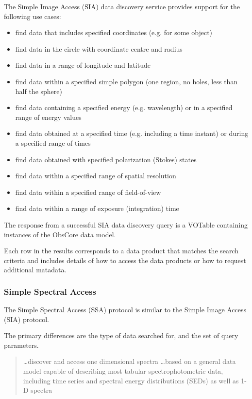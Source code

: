 \documentclass{article}
\begin{document}
The Simple Image Access (SIA) data discovery service provides support for
the following use cases:

\begin{itemize}
  \item find data that includes specified coordinates (e.g. for some object) 
  \item find data in the circle with coordinate centre and radius 
  \item find data in a range of longitude and latitude 
  \item find data within a specified simple  polygon (one region, no holes, less
  than half the sphere)
  \item find data containing a specified energy (e.g. wavelength) or in a
  specified range of energy values
  \item find data obtained at a specified time (e.g. including a time instant)
  or during a specified range of times
  \item find data obtained with specified polarization (Stokes) states 
  \item find data within a specified range of spatial resolution 
  \item find data within a specified range of field-of-view 
  \item find data within a range of exposure (integration) time 
\end{itemize}

The response from a successful SIA data discovery query is a VOTable containing
instances of the ObsCore  data
model.

Each row in the results corresponds to a data product that matches the search
criteria and includes details of how to access the data products or how
to request additional matadata.

\subsubsection{Simple Spectral Access}

The Simple Spectral Access (SSA) protocol is similar to the Simple Image Access (SIA) protocol.

The primary differences are the type of data searched for, and the set of query
parameters.

\begin{quote}
\ldots discover and access one dimensional spectra
\ldots based on a general data model capable of describing most tabular
spectrophotometric data, including time series and spectral energy distributions
(SEDs) as well as 1-D spectra
\end{quote}
\end{document}
